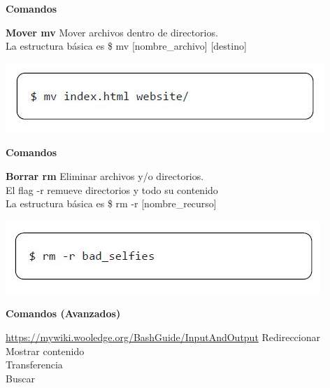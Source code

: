 \documentclass{beamer}
\begin{document}
\begin{frame}
	
	\textbf{Comandos}
	\begin{block}{\textbf{Mover mv}}
		Mover archivos dentro de directorios. \\ 
		La estructura básica es \$ mv [nombre\_archivo] [destino]
	\end{block}	
	\begin{center}
		\includegraphics[scale=.6]{img/bash/mv.JPG}
	\end{center}
	
\end{frame}

\begin{frame}
	
	\textbf{Comandos}
	\begin{block}{\textbf{Borrar rm}}
		Eliminar archivos y/o directorios. \\ 
		El flag -r remueve directorios y todo su contenido\\
		La estructura básica es \$ rm -r [nombre\_recurso] 
	\end{block}	
	\begin{center}
		\includegraphics[scale=.6]{img/bash/rm.JPG}
	\end{center}
	
\end{frame}

\begin{frame}
	
	\textbf{Comandos (Avanzados)}
	\begin{block}{\hyperlink{https://mywiki.wooledge.org/BashGuide/InputAndOutput}{https://mywiki.wooledge.org/BashGuide/InputAndOutput}}
		Redireccionar  \\
		\vspace{0.3cm}
		Mostrar contenido \\ 
		\vspace{0.3cm}
		Transferencia \\
		\vspace{0.3cm}
		Buscar \\
	\end{block}	

\end{frame}
\end{document}
